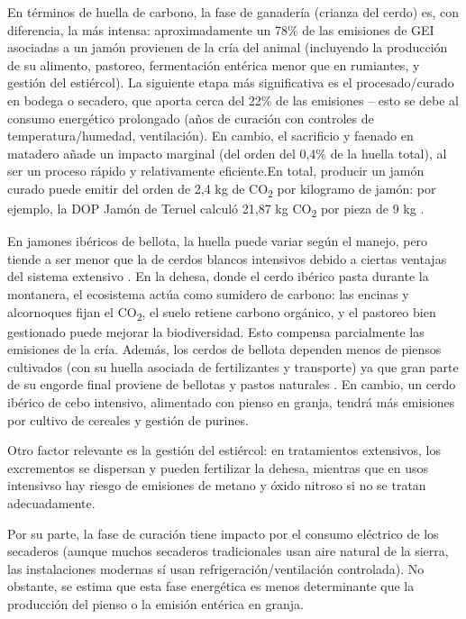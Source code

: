 En términos de huella de carbono, la fase de ganadería (crianza del cerdo) es, con diferencia, la más intensa: aproximadamente un 78\% de las emisiones de GEI asociadas a un jamón provienen de la cría del animal (incluyendo la producción de su alimento, pastoreo, fermentación entérica menor que en rumiantes, y gestión del estiércol). La siguiente etapa más significativa es el procesado/curado en bodega o secadero, que aporta cerca del 22\% de las emisiones – esto se debe al consumo energético prolongado (años de curación con controles de temperatura/humedad, ventilación). En cambio, el sacrificio y faenado en matadero añade un impacto marginal (del orden del 0,4\% de la huella total), al ser un proceso rápido y relativamente eficiente.En total, producir un jamón curado puede emitir del orden de 2,4 kg de CO\textsubscript{2} por kilogramo de jamón: por ejemplo, la DOP Jamón de Teruel calculó 21,87 kg CO\textsubscript{2} por pieza de 9 kg \cite{noauthor_producir_nodate}.

En jamones ibéricos de bellota, la huella puede variar según el manejo, pero tiende a ser menor que la de cerdos blancos intensivos debido a ciertas ventajas del sistema extensivo \cite{noauthor_huella_2025}. En la dehesa, donde el cerdo ibérico pasta durante la montanera, el ecosistema actúa como sumidero de carbono: las encinas y alcornoques fijan el CO\textsubscript{2}, el suelo retiene carbono orgánico, y el pastoreo bien gestionado puede mejorar la biodiversidad. Esto compensa parcialmente las emisiones de la cría. Además, los cerdos de bellota dependen menos de piensos cultivados (con su huella asociada de fertilizantes y transporte) ya que gran parte de su engorde final proviene de bellotas y pastos naturales \cite{noauthor_huella_2025} \cite{noauthor_producir_nodate}. En cambio, un cerdo ibérico de cebo intensivo, alimentado con pienso en granja, tendrá más emisiones por cultivo de cereales y gestión de purines.

Otro factor relevante es la gestión del estiércol: en tratamientos extensivos, los excrementos se dispersan y pueden fertilizar la dehesa, mientras que en usos intensivso hay riesgo de emisiones de metano y óxido nitroso si no se tratan adecuadamente.

Por su parte, la fase de curación tiene impacto por el consumo eléctrico de los secaderos (aunque muchos secaderos tradicionales usan aire natural de la sierra, las instalaciones modernas sí usan refrigeración/ventilación controlada). No obstante, se estima que esta fase energética es menos determinante que la producción del pienso o la emisión entérica en granja.


